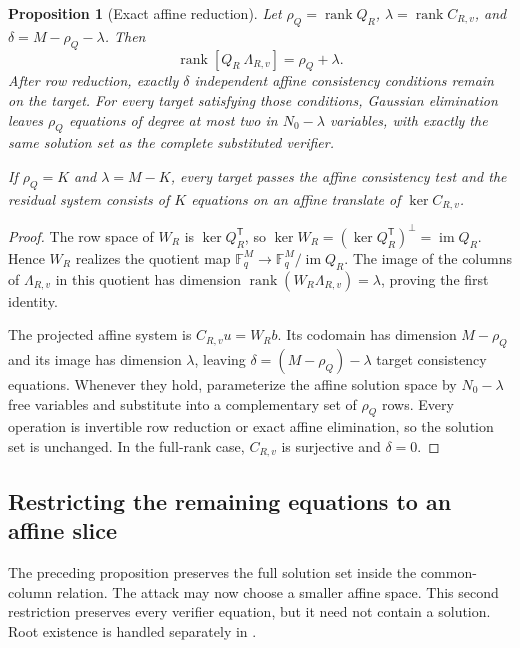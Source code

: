 \documentclass[11pt]{article}
\newtheorem{proposition}[proposition]{Proposition}
\newcommand{\F}{\mathbb F}
\newcommand{\rank}{\operatorname{rank}}
\newcommand{\im}{\operatorname{im}}
\newcommand{\transpose}{\mathsf T}
\begin{document}
\begin{proposition}[Exact affine reduction]\label{prop:exact-affine}
Let $\rho_Q=\rank Q_R$, $\lambda=\rank C_{R,v}$, and
$\delta=M-\rho_Q-\lambda$.  Then
\[
  \rank[Q_R\ \Lambda_{R,v}]=\rho_Q+\lambda.
\]
After row reduction, exactly $\delta$ independent affine consistency
conditions remain on the target.  For every target satisfying those
conditions, Gaussian elimination leaves $\rho_Q$ equations of degree at most
two in $N_0-\lambda$ variables, with exactly the same solution set as the
complete substituted verifier.

If $\rho_Q=K$ and $\lambda=M-K$, every target passes the affine consistency
test and the residual system consists of $K$ equations on an affine translate
of $\ker C_{R,v}$.
\end{proposition}

\begin{proof}
The row space of $W_R$ is $\ker Q_R^\transpose$, so
$\ker W_R=(\ker Q_R^\transpose)^\perp=\im Q_R$.  Hence $W_R$ realizes the
quotient map $\F_q^M\to\F_q^M/\im Q_R$.  The image of the columns of
$\Lambda_{R,v}$ in this quotient has dimension
$\rank(W_R\Lambda_{R,v})=\lambda$, proving the first identity.

The projected affine system is $C_{R,v}u=W_Rb$.  Its codomain has dimension
$M-\rho_Q$ and its image has dimension $\lambda$, leaving
$\delta=(M-\rho_Q)-\lambda$ target consistency equations.  Whenever they
hold, parameterize the affine solution space by $N_0-\lambda$ free variables
and substitute into a complementary set of $\rho_Q$ rows.  Every operation is
invertible row reduction or exact affine elimination, so the solution set is
unchanged.  In the full-rank case, $C_{R,v}$ is surjective and $\delta=0$.
\end{proof}

\subsection{Restricting the remaining equations to an affine slice}
The preceding proposition preserves the full solution set inside the
common-column relation.  The attack may now choose a smaller affine space.
This second restriction preserves every verifier equation, but it need not
contain a solution.  Root existence is handled separately in
.
\end{document}
